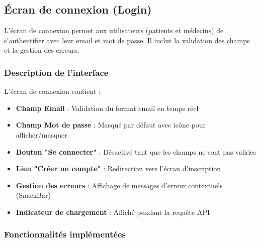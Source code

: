\documentclass[a4paper,11pt]{report}
\begin{document}
\subsection{Écran de connexion (Login)}

L'écran de connexion permet aux utilisateurs (patients et médecins) de s'authentifier avec leur email et mot de passe. Il inclut la validation des champs et la gestion des erreurs.

\subsubsection{Description de l'interface}

L'écran de connexion contient :
\begin{itemize}
    \item \textbf{Champ Email} : Validation du format email en temps réel
    \item \textbf{Champ Mot de passe} : Masqué par défaut avec icône pour afficher/masquer
    \item \textbf{Bouton "Se connecter"} : Désactivé tant que les champs ne sont pas valides
    \item \textbf{Lien "Créer un compte"} : Redirection vers l'écran d'inscription
    \item \textbf{Gestion des erreurs} : Affichage de messages d'erreur contextuels (SnackBar)
    \item \textbf{Indicateur de chargement} : Affiché pendant la requête API
\end{itemize}

\subsubsection{Fonctionnalités implémentées}
\end{document}

